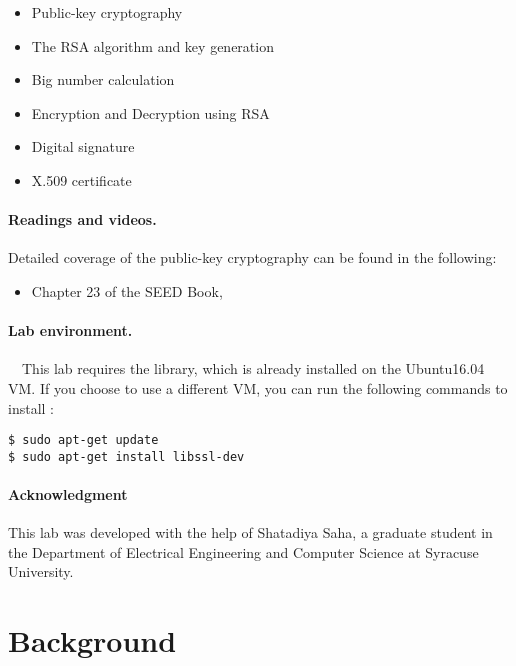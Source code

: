 \begin{itemize}[noitemsep]
\item Public-key cryptography
\item The RSA algorithm and key generation
\item Big number calculation
\item Encryption and Decryption using RSA
\item Digital signature
\item X.509 certificate
\end{itemize}


\paragraph{Readings and videos.}
Detailed coverage of the public-key cryptography can be found in the following:

\begin{itemize}
\item Chapter 23 of the SEED Book, \seedbook
\end{itemize}


\paragraph{Lab environment.} \seedenvironment \ \
This lab requires the \openssl library, which is already
installed on the Ubuntu16.04 VM. If you choose to use
a different VM, you can run the following commands to install \openssl:

\begin{lstlisting}
$ sudo apt-get update
$ sudo apt-get install libssl-dev
\end{lstlisting}


\paragraph{Acknowledgment} This lab was developed with the help of
Shatadiya Saha, a graduate student in the Department of
Electrical Engineering and Computer Science at Syracuse University.




\section{Background}


